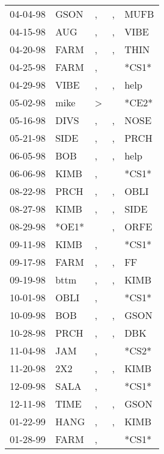 \begin{supertabular}{lllll}
 04-04-98 &   GSON &             , &             , &   MUFB \\
 04-15-98 &    AUG &             , &             , &   VIBE \\
 04-20-98 &   FARM &             , &             , &   THIN \\
 04-25-98 &   FARM &             , &               &  *CS1* \\
 04-29-98 &   VIBE &             , &             , &   help \\
 05-02-98 &   mike &  \textgreater &               &  *CE2* \\
 05-16-98 &   DIVS &             , &             , &   NOSE \\
 05-21-98 &   SIDE &             , &             , &   PRCH \\
 06-05-98 &    BOB &             , &             , &   help \\
 06-06-98 &   KIMB &             , &               &  *CS1* \\
 08-22-98 &   PRCH &             , &             , &   OBLI \\
 08-27-98 &   KIMB &             , &             , &   SIDE \\
 08-29-98 &  *OE1* &               &             , &   ORFE \\
 09-11-98 &   KIMB &             , &               &  *CS1* \\
 09-17-98 &   FARM &             , &             , &     FF \\
 09-19-98 &   bttm &             , &             , &   KIMB \\
 10-01-98 &   OBLI &             , &               &  *CS1* \\
 10-09-98 &    BOB &             , &             , &   GSON \\
 10-28-98 &   PRCH &             , &             , &    DBK \\
 11-04-98 &    JAM &             , &               &  *CS2* \\
 11-20-98 &    2X2 &             , &             , &   KIMB \\
 12-09-98 &   SALA &             , &               &  *CS1* \\
 12-11-98 &   TIME &             , &             , &   GSON \\
 01-22-99 &   HANG &             , &             , &   KIMB \\
 01-28-99 &   FARM &             , &               &  *CS1* \\

\end{supertabular}
